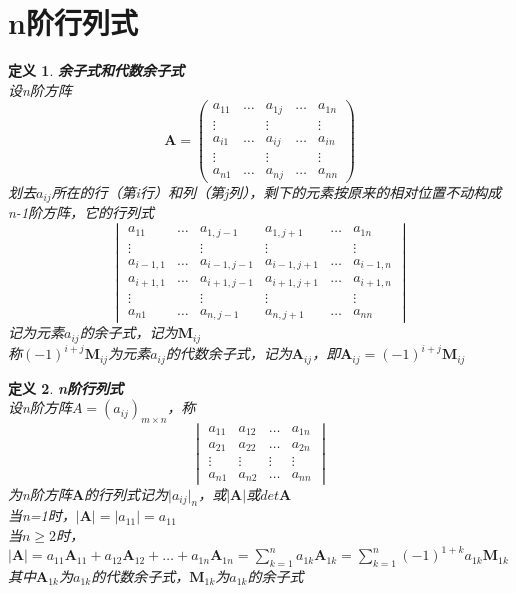 \documentclass[a4paper]{ctexbook}
\newtheorem{definition}{定义}[section]
\begin{document}
\section{n阶行列式}
\begin{definition}
    \textbf{余子式和代数余子式}
    \\设n阶方阵\[\mathbf{A}=
    \begin{pmatrix}
        a_{11}&\dots&a_{1j}&\dots&a_{1n}
        \\ \vdots&&\vdots&&\vdots
        \\ a_{i1}&\dots&a_{ij}&\dots&a_{in}
        \\ \vdots&&\vdots&&\vdots
        \\ a_{n1}&\dots&a_{nj}&\dots&a_{nn}
    \end{pmatrix}\]
    划去\(a_{ij}\)所在的行（第i行）和列（第j列），剩下的元素按原来的相对位置不动构成n-1阶方阵，它的行列式
    \[\begin{vmatrix}
        a_{11}&\dots&a_{1,j-1}&a_{1,j+1}&\dots&a_{1n}
        \\\vdots&&\vdots&\vdots&&\vdots
        \\a_{i-1,1}&\dots&a_{i-1,j-1}&a_{i-1,j+1}&\dots&a_{i-1,n}
        \\a_{i+1,1}&\dots&a_{i+1,j-1}&a_{i+1,j+1}&\dots&a_{i+1,n}
        \\\vdots&&\vdots&\vdots&&\vdots
        \\a_{n1}&\dots&a_{n,j-1}&a_{n,j+1}&\dots&a_{nn}
    \end{vmatrix}\]
    记为元素\(a_{ij}\)的余子式，记为\(\mathbf{M}_{ij}\)
    \\称\((-1)^{i+j}\mathbf{M}_{ij}\)为元素\(a_{ij}\)的代数余子式，记为\(\mathbf{A}_{ij}\)，即\(\mathbf{A}_{ij}=(-1)^{i+j}\mathbf{M}_{ij}\)
\end{definition}
\begin{definition}
    \textbf{n阶行列式}\\
    设n阶方阵\(A=(a_{ij})_{m\times n}\)，称
    \[\begin{vmatrix}
        a_{11}&a_{12}&\dots&a_{1n}
        \\a_{21}&a_{22}&\dots&a_{2n}
        \\ \vdots &\vdots &\vdots &\vdots
        \\a_{n1}&a_{n2}&\dots&a_{nn}
    \end{vmatrix}\]
    为n阶方阵\(\mathbf{A}\)的行列式记为\(\rvert{a_{ij}}\rvert_n\)，或\(\rvert\mathbf{A}\rvert\)或\(det{\mathbf{A}}\)
    \\当n=1时，\(\rvert\mathbf{A}\rvert=\rvert a_{11}\rvert = a_{11}\)
    \\当\(n\geq 2\)时，\(\rvert\mathbf{A}\rvert=a_{11}\mathbf{A}_{11}+a_{12}\mathbf{A}_{12}+\dots+a_{1n}\mathbf{A}_{1n}=\sum\limits_{k=1}^n a_{1k}\mathbf{A}_{1k}=\sum\limits_{k=1}^n (-1)^{1+k}a_{1k}\mathbf{M}_{1k}\)
    \\其中\(\mathbf{A}_{1k}\)为\(a_{1k}\)的代数余子式，\(\mathbf{M}_{1k}\)为\(a_{1k}\)的余子式
\end{definition}
\end{document}
